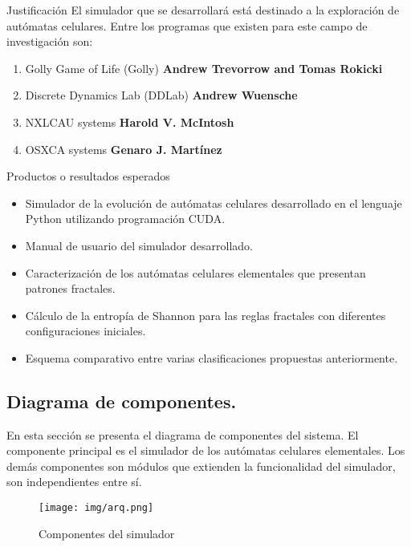 \documentclass{article}
\begin{document}
\begin{section}{Justificación}
        \noindent El simulador que se desarrollará está destinado a la exploración de autómatas celulares. Entre los programas que existen para este campo de investigación son: 
        \begin{enumerate}
            \item Golly Game of Life (Golly) \textbf{Andrew Trevorrow and Tomas Rokicki}
            \item Discrete Dynamics Lab (DDLab) \textbf{Andrew Wuensche}
            \item NXLCAU systems \textbf{Harold V. McIntosh}
            \item OSXCA systems \textbf{Genaro J. Martínez}
        \end{enumerate}
    \end{section}
    
    \begin{section}{Productos o resultados esperados}
        \begin{itemize}
            \item Simulador de la evolución de autómatas celulares desarrollado en el lenguaje Python utilizando programación CUDA.
            \item Manual de usuario del simulador desarrollado.
            \item Caracterización de los autómatas celulares elementales que presentan patrones fractales.
            \item Cálculo de la entropía de Shannon para las reglas fractales con diferentes configuraciones iniciales.
            \item Esquema comparativo entre varias clasificaciones propuestas anteriormente.
        \end{itemize}	
    
        \subsection{Diagrama de componentes.}
            \noindent En esta sección se presenta el diagrama de componentes del sistema. El componente principal es el simulador de los autómatas celulares elementales. Los demás componentes son módulos que extienden la funcionalidad del simulador, son independientes entre sí.
            \begin{figure}[H]
                \centering
                \texttt{[image: img/arq.png]}
                \caption{Componentes del simulador}
                \label{fig:dagrama}
            \end{figure}
    \end{section}
    
\end{document}
